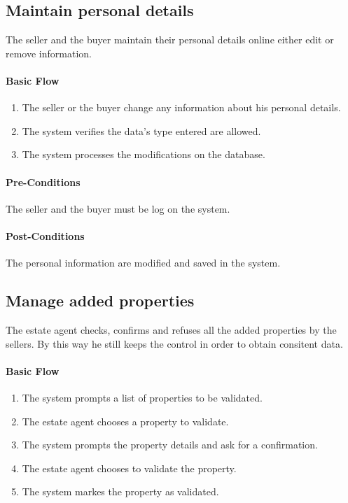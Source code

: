 \documentclass[a4paper,12pt]{article}
\begin{document}
\subsection{Maintain personal details}

The seller and the buyer maintain their personal details online either edit or remove information.

\paragraph{Basic Flow}
\begin{enumerate}
\item The seller or the buyer change any information about his personal details.
\item The system verifies the data's type entered are allowed.
\item The system processes the modifications on the database.
\end{enumerate}
\paragraph{Pre-Conditions}
The seller and the buyer must be log on the system.
\paragraph{Post-Conditions}
The personal information are modified and saved in the system.

\subsection{Manage added properties}

The estate agent checks, confirms and refuses all the added properties by the sellers. By this way he still keeps the control in order to obtain consitent data.

\paragraph{Basic Flow}
\begin{enumerate}
\item The system prompts a list of properties to be validated.
\item The estate agent chooses a property to validate.
\item The system prompts the property details and ask for a confirmation.
\item The estate agent chooses to validate the property.
\item The system markes the property as validated.
\end{enumerate}
\end{document}
